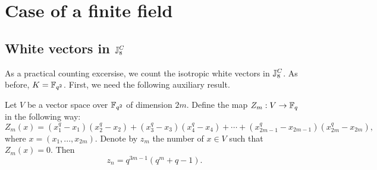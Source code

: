  

\section{Case of a finite field}
\subsection{White vectors in $\mathbb{J}_8^C$}

As a practical counting excersise, we count the isotropic white vectors in $\mathbb{J}_{8}^{C}$.
As before, $K = \mathbb{F}_{q^2}$. First, we need the following auxiliary result.

\begin{lemma}
		\label{lemma:zn}
		Let $V$ be a vector space over $\mathbb{F}_{q^2}$ of dimension $2m$. 
		Define the map $Z_m: V \rightarrow \mathbb{F}_q$ in the following way:
		\begin{equation*}
			Z_m(x) = (x_1^q - x_1) (x_2^q - x_2) + (x_3^q - x_3) (x_4^q - x_4) + \cdots +
			(x_{2m-1}^q-x_{2m-1}) (x_{2m}^q - x_{2m}),
		\end{equation*}
		where $x = (x_1, ..., x_{2m})$. 
		Denote by $z_m$ the number of $x\in V$ such that $Z_m(x) = 0$. Then
		\begin{equation*}
			z_n = q^{3m-1}(q^m+q-1).
		\end{equation*}
\end{lemma}

